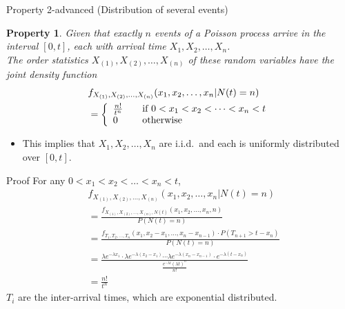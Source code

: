 \documentclass[mathserif]{beamer}
\newtheorem{pty}{Property}
\begin{document}
\begin{frame}{Property 2-advanced (Distribution of several events)}
\begin{pty}
Given that exactly $n$ events of a Poisson process arrive in the interval $[0,t]$,
each with arrival time $X_1, X_2, \ldots, X_n$.\\
The order statistics $X_{(1)}, X_{(2)}, \ldots, X_{(n)}$ of these random variables have the joint density function
\begin{align*}
& f_{X_{(1)}, X_{(2)}, \ldots, X_{(n)}}(x_1, x_2, \ldots, x_n | N(t)=n) \\
& = \left\{
\begin{array}{l l}
\frac{n!}{t^n} & \quad\text{if } 0 < x_1 < x_2 < \cdots < x_n < t \\
0 & \quad\text{otherwise} \\
\end{array}
\right.
\end{align*}
\end{pty}
\begin{itemize}
\item This implies that $X_1, X_2, \ldots, X_n$ are i.i.d.\ and each is uniformly distributed over $[0,t]$.
\end{itemize}
\end{frame}

\begin{frame}{Proof}
For any $0 < x_1 < x_2 < \ldots < x_n < t$,
\begin{align*}
& f_{X_{(1)}, X_{(2)}, \ldots, X_{(n)}}(x_1, x_2, \ldots, x_n | N(t)=n) \\
& = \frac{f_{X_{(1)}, X_{(2)}, \ldots, X_{(n)}, N(t)}(x_1, x_2, \ldots, x_n, n)}{P(N(t) = n)} \\
& = \frac{f_{T_1, T_2, \ldots, T_n}(x_1, x_2 - x_1, \ldots, x_n - x_{n-1})\cdot P(T_{n+1} > t - x_n)}{P(N(t) = n)} \\
& = \frac{\lambda e^{-\lambda x_1}\cdot\lambda e^{-\lambda(x_2-x_1)}\cdots\lambda e^{-\lambda(x_n-x_{n-1})}\cdot e^{-\lambda(t-x_n)}}{\frac{e^{-\lambda t}(\lambda t)^n}{n!}} \\
& = \frac{n!}{t^n}
\end{align*}
$T_i$ are the inter-arrival times, which are exponential distributed.
\end{frame}
\end{document}
